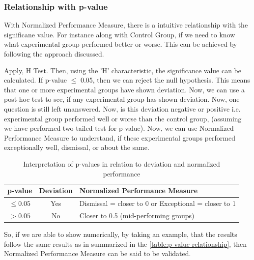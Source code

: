 \documentclass[a4paper,fleqn,review]{cas-sc}
\begin{document}
\subsubsection{Relationship with p-value}
With Normalized Performance Measure, there is a intuitive relationship with the significane value. For instance along with Control Group, if we need to know what experimental group performed better or worse. This can be achieved by following the approach discussed.

Apply, \cite{kruskal1952use} H Test. Then, using the 'H' characteristic, the significance value can be calculated. If p-value $\le$ 0.05, then we can reject the null hypothesis. This means that one or more experimental groups have shown deviation. Now, we can use a post-hoc \cite{dunnett1955multiple} test to see, if any experimental group has shown deviation. Now, one question is still left unanswered. Now, is this deviation negative or positive i.e. experimental group performed well or worse than the control group, (assuming we have performed two-tailed test for p-value). Now, we can use Normalized Performance Measure to understand, if these experimental groups performed exceptionally well, dismissal, or about the same.
\begin{table}
	\centering
	\begin{tabular}{|c|c|l|}
		\hline
		\textbf{p-value} & \textbf{Deviation} & \textbf{Normalized Performance Measure} \\
		\hline
		$\leq 0.05$ & Yes & Dismissal = closer to 0 or Exceptional = closer to 1 \\
		\hline
		$> 0.05$ & No & Closer to 0.5 (mid-performing groups) \\
		\hline
	\end{tabular}
	\vspace{2pt}
	\caption{Interpretation of p-values in relation to deviation and normalized performance}
	\label{table:p-value-relationship}
\end{table}
So, if we are able to show numerically, by taking an example, that the results follow the same results as in summarized in the \autoref{table:p-value-relationship}, then Normalized Performance Measure can be said to be validated.
\end{document}

